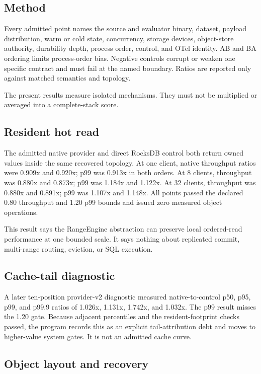 \documentclass[sigconf,nonacm]{acmart}
\begin{document}
\subsection{Method}

Every admitted point names the source and evaluator binary, dataset, payload
distribution, warm or cold state, concurrency, storage devices, object-store
authority, durability depth, process order, control, and OTel identity. AB and
BA ordering limits process-order bias. Negative controls corrupt or weaken one
specific contract and must fail at the named boundary. Ratios are reported only
against matched semantics and topology.

The present results measure isolated mechanisms. They must not be multiplied or
averaged into a complete-stack score.

\subsection{Resident hot read}

The admitted native provider and direct RocksDB control both return owned values
inside the same recovered topology. At one client, native throughput ratios were
0.909x and 0.920x; p99 was 0.913x in both orders. At 8 clients, throughput was
0.880x and 0.873x; p99 was 1.184x and 1.122x. At 32 clients, throughput was
0.880x and 0.891x; p99 was 1.107x and 1.148x. All points passed the declared
0.80 throughput and 1.20 p99 bounds and issued zero measured object operations.

This result says the RangeEngine abstraction can preserve local ordered-read
performance at one bounded scale. It says nothing about replicated commit,
multi-range routing, eviction, or SQL execution.

\subsection{Cache-tail diagnostic}

A later ten-position provider-v2 diagnostic measured native-to-control p50,
p95, p99, and p99.9 ratios of 1.026x, 1.131x, 1.742x, and 1.032x. The p99 result
misses the 1.20 gate. Because adjacent percentiles and the resident-footprint
checks passed, the program records this as an explicit tail-attribution debt and
moves to higher-value system gates. It is not an admitted cache curve.

\subsection{Object layout and recovery}
\end{document}
